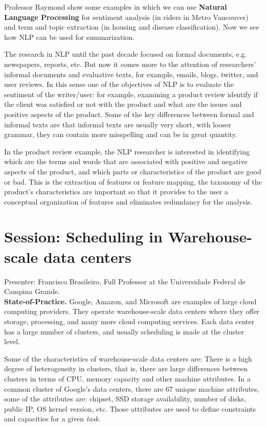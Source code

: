 \documentclass[9pt,a4paper]{article}
\begin{document}
Professor Raymond show some examples in which we can use \textbf{Natural Language Processing} for sentiment analysis (in riders in Metro Vancouver) and term and topic extraction (in housing and disease classification). Now we see how NLP can be used for summarization.

The research in NLP until the past decade focused on formal documents, e.g. newspapers, reports, etc. But now it comes more to the attention of researchers' informal documents and evaluative texts, for example, emails, blogs, twitter, and user reviews. In this sense one of the objectives of NLP is to evaluate the sentiment of the writer/user: for example, examining a product review identify if the client was satisfied or not with the product and what are the issues and positive aspects of the product. Some of the key differences between formal and informal texts are that informal texts are usually very short, with looser grammar, they can contain more misspelling and can be in great quantity.

In the product review example, the NLP researcher is interested in identifying which are the terms and words that are associated with positive and negative aspects of the product, and which parts or characteristics of the product are good or bad. This is the extraction of features or feature mapping, the taxonomy of the product's characteristics are important so that it provides to the user a conceptual organization of features and eliminates redundancy for the analysis.

\section*{Session: Scheduling in Warehouse-scale  data centers}

Presenter: Francisco Brasileiro, Full Professor at the Universidade Federal de Campina Grande.\\
    
\textbf{State-of-Practice.} Google, Amazon, and Microsoft are examples of large cloud computing providers. 
They operate warehouse-scale data centers where they offer storage, processing, and many more cloud computing services. 
Each data center has a large number of clusters, and usually scheduling is made at the cluster level. 



Some of the characteristics of warehouse-scale data centers are: There is a high degree of heterogeneity in clusters, that is, there are large differences between clusters in terms of CPU, memory capacity and other machine attributes. 
In a common cluster of Google's data centers, there are 67 unique machine attributes, some of the attributes are: chipset, SSD storage availability, number of disks, public IP, OS kernel version, etc. Those attributes are used to define constraints and capacities for a given \textit{task}.
\end{document}
